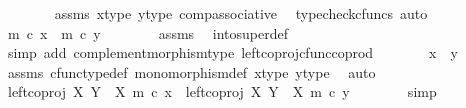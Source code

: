 \begin{isabellebody}
\ \ \ \ \ \ \isamarkupfalse%
\ assms\ x{\isacharprime}{\kern0pt}{\isacharunderscore}{\kern0pt}type\ y{\isacharprime}{\kern0pt}{\isacharunderscore}{\kern0pt}type\ comp{\isacharunderscore}{\kern0pt}associative{}\ \isamarkupfalse%
\ {\isacharparenleft}{\kern0pt}typecheck{\isacharunderscore}{\kern0pt}cfuncs{\isacharcomma}{\kern0pt}\ auto{\isacharparenright}{\kern0pt}\isanewline
\ \ \ \ \isamarkupfalse%
\ \isamarkupfalse%
\ {\isachardoublequoteopen}m\ {\isasymcirc}\isactrlsub c\ x{\isacharprime}{\kern0pt}\ {\isacharequal}{\kern0pt}\ m\ {\isasymcirc}\isactrlsub c\ y{\isacharprime}{\kern0pt}{\isachardoublequoteclose}\isanewline
\ \ \ \ \ \ \isamarkupfalse%
\ assms\ \isamarkupfalse%
\ into{\isacharunderscore}{\kern0pt}super{\isacharunderscore}{\kern0pt}def\isanewline
\ \ \ \ \ \ \isamarkupfalse%
\ {\isacharparenleft}{\kern0pt}simp\ add{\isacharcolon}{\kern0pt}\ complement{\isacharunderscore}{\kern0pt}morphism{\isacharunderscore}{\kern0pt}type\ left{\isacharunderscore}{\kern0pt}coproj{\isacharunderscore}{\kern0pt}cfunc{\isacharunderscore}{\kern0pt}coprod{\isacharparenright}{\kern0pt}\isanewline
\ \ \ \ \isamarkupfalse%
\ \isamarkupfalse%
\ {\isachardoublequoteopen}x{\isacharprime}{\kern0pt}\ {\isacharequal}{\kern0pt}\ y{\isacharprime}{\kern0pt}{\isachardoublequoteclose}\isanewline
\ \ \ \ \ \ \isamarkupfalse%
\ assms\ cfunc{\isacharunderscore}{\kern0pt}type{\isacharunderscore}{\kern0pt}def\ monomorphism{\isacharunderscore}{\kern0pt}def\ x{\isacharprime}{\kern0pt}{\isacharunderscore}{\kern0pt}type\ y{\isacharprime}{\kern0pt}{\isacharunderscore}{\kern0pt}type\ \isamarkupfalse%
\ auto\isanewline
\ \ \ \ \isamarkupfalse%
\ \isamarkupfalse%
\ {\isachardoublequoteopen}left{\isacharunderscore}{\kern0pt}coproj\ X\ {\isacharparenleft}{\kern0pt}Y\ {\isasymsetminus}\ {\isacharparenleft}{\kern0pt}X{\isacharcomma}{\kern0pt}\ m{\isacharparenright}{\kern0pt}{\isacharparenright}{\kern0pt}\ {\isasymcirc}\isactrlsub c\ x{\isacharprime}{\kern0pt}\ {\isacharequal}{\kern0pt}\ left{\isacharunderscore}{\kern0pt}coproj\ X\ {\isacharparenleft}{\kern0pt}Y\ {\isasymsetminus}\ {\isacharparenleft}{\kern0pt}X{\isacharcomma}{\kern0pt}\ m{\isacharparenright}{\kern0pt}{\isacharparenright}{\kern0pt}\ {\isasymcirc}\isactrlsub c\ y{\isacharprime}{\kern0pt}{\isachardoublequoteclose}\isanewline
\ \ \ \ \ \ \isamarkupfalse%
\ simp\isanewline
\ \ \isamarkupfalse%

\end{isabellebody}
